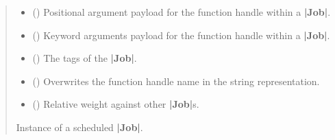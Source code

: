 \documentclass[letterpaper,10pt,english]{sphinxmanual}
\begin{document}
\begin{fulllineitems}
\begin{fulllineitems}
\begin{quote}
\begin{description}
\begin{itemize}
\item {} 
\sphinxAtStartPar
{} (\sphinxstyleliteralemphasis{\sphinxupquote{{[}}}\sphinxstyleliteralemphasis{\sphinxupquote{{]}}}) \textendash{} Positional argument payload for the function handle within a {\color{red}\bfseries{}|Job|}.

\item {} 
\sphinxAtStartPar
{} (\sphinxstyleliteralemphasis{\sphinxupquote{{[}}}\sphinxstyleliteralemphasis{\sphinxupquote{{[}}}\sphinxstyleliteralemphasis{\sphinxupquote{, }}\sphinxstyleliteralemphasis{\sphinxupquote{{]}}}\sphinxstyleliteralemphasis{\sphinxupquote{{]}}}) \textendash{} Keyword arguments payload for the function handle within a {\color{red}\bfseries{}|Job|}.

\item {} 
\sphinxAtStartPar
{} (\sphinxstyleliteralemphasis{\sphinxupquote{{[}}}\sphinxstyleliteralemphasis{\sphinxupquote{{[}}}\sphinxstyleliteralemphasis{\sphinxupquote{{]}}}\sphinxstyleliteralemphasis{\sphinxupquote{{]}}}) \textendash{} The tags of the {\color{red}\bfseries{}|Job|}.

\item {} 
\sphinxAtStartPar
{} (\sphinxstyleliteralemphasis{\sphinxupquote{{[}}}\sphinxstyleliteralemphasis{\sphinxupquote{{]}}}) \textendash{} Overwrites the function handle name in the string representation.

\item {} 
\sphinxAtStartPar
{} () \textendash{} Relative weight against other {\color{red}\bfseries{}|Job|}s.

\end{itemize}

\sphinxAtStartPar
Instance of a scheduled {\color{red}\bfseries{}|Job|}.


\end{description}
\end{quote}
\end{fulllineitems}
\end{fulllineitems}
\end{document}
